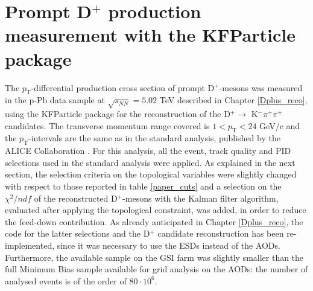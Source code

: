\documentclass[b5paper,10pt,twoside,oldstyle,classica]{toptesi}
\newcommand{\pt}{p_\text{T}}
\begin{document}
\section{Prompt D$^+$ production measurement with the KFParticle package}
\label{KF_Dplus_meas}
The $\pt$-differential production cross section of prompt D$^+$-mesons was measured in the p-Pb data sample at $\sqrt{s_{NN}}=5.02$ TeV described in Chapter \ref{Dplus_reco}, using the KFParticle package for the reconstruction of the D$^+\rightarrow$ K$^-\pi^+\pi^+$ candidates. The transverse momentum range covered is $1<\pt<24$ GeV/c and the $\pt$-intervals are the same as in the standard analysis, published by the ALICE Collaboration \cite{Abelev:2014hha}. For this analysis, all the event, track quality and PID selections used in the standard analysis were applied. As explained in the next section, the selection criteria on the topological variables were slightly changed with respect to those reported in table \ref{paper_cuts} and a selection on the $\chi^2/ndf$ of the reconstructed D$^+$-mesons with the Kalman filter algorithm, evaluated after applying the topological constraint, was added, in order to reduce the feed-down contribution. As already anticipated in Chapter \ref{Dplus_reco}, the code for the latter selections and the D$^+$ candidate reconstruction has been re-implemented, since it was necessary to use the ESDs instead of the AODs. Furthermore, the available sample on the GSI farm was slightly smaller than the full Minimum Bias sample available for grid analysis on the AODs: the number of analysed events is of the order of $80\cdot10^6$.  
\end{document}
